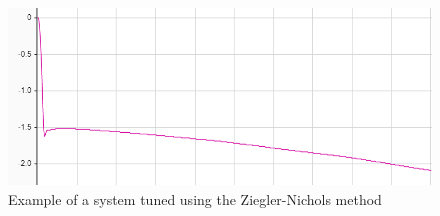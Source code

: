 \begin{figure}[H]
    \begin{center}
    \includegraphics[scale=1]{pictures/control/zpidnoise}
    \end{center}
    \caption{Example of a system tuned using the Ziegler-Nichols method\cite{LibrePID}}
    \label{fig:zpidnoise}
\end{figure}
